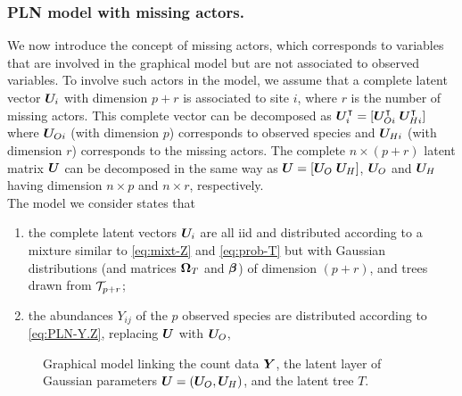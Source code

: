 \subsubsection*{PLN model with missing actors.} 
We now introduce the concept of missing actors, which corresponds to variables that are involved in the graphical model but are not associated to observed variables. To involve such actors in the model, we assume that a complete latent vector ${\boldsymbol{U}}_i$ with dimension $p+r$ is associated to site $i$, where $r$ is the number of missing actors. This complete vector can be decomposed as ${\boldsymbol{U}}_i^\intercal = [{\boldsymbol{U}}_{Oi}^\intercal \; {\boldsymbol{U}}_{Hi}^\intercal]$ where ${\boldsymbol{U}}_{Oi}$ (with dimension $p$) corresponds to observed species and ${\boldsymbol{U}}_{Hi}$ (with dimension $r$) corresponds to the missing actors.
The complete $n \times (p+r)$ latent matrix ${\boldsymbol{U}}$ can be decomposed in the same way as ${\boldsymbol{U}} = [{\boldsymbol{U}}_O \; {\boldsymbol{U}}_H]$, ${\boldsymbol{U}}_O$ and ${\boldsymbol{U}}_H$ having dimension $n \times p$ and $n \times r$, respectively. \\ 
The model we consider states that
\begin{enumerate}[label=\roman*]
\item the complete latent vectors ${\boldsymbol{U}}_i$ are all iid and distributed according to a mixture similar to \eqref{eq:mixt-Z} and \eqref{eq:prob-T} but with Gaussian distributions (and matrices ${\boldsymbol{\Omega}}_T$ and ${\boldsymbol{\beta}}$) of dimension $(p+r)$, and trees drawn from ${\mathcal{T}}_{p+r}$;
\item  the abundances $Y_{ij}$ of the  $p$ observed species are distributed according to \eqref{eq:PLN-Y.Z}, replacing ${\boldsymbol{U}}$ with ${\boldsymbol{U}}_O$,
\end{enumerate}

\begin{figure}[H]
 \begin{center}
 \caption{Graphical model linking the count data ${\boldsymbol{Y}}$, the latent layer of Gaussian parameters ${\boldsymbol{U}}=({\boldsymbol{U}}_O,{\boldsymbol{U}}_H)$, and the latent tree $T$.}
  \label{fig:MGmodel}
    \end{center}
\end{figure}

